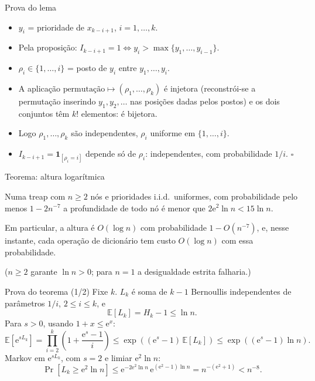 \documentclass[aspectratio=169,11pt]{beamer}
\newcommand{\E}[1]{\mathbb{E}\!\left[#1\right]}
\newcommand{\ProbE}[1]{\Pr\!\left[#1\right]}
\newcommand{\Ind}[1]{\mathbf{1}_{#1}}
\newcommand{\paren}[1]{\left(#1\right)}
\theoremstyle{definition}
\begin{document}
\begin{frame}{Prova do lema}
  \begin{itemize}
  \item $y_i$ = prioridade de $x_{k-i+1}$, $i=1,\dots,k$.
  \item Pela proposição: $I_{k-i+1}=1\iff y_i>\max\{y_1,\dots,y_{i-1}\}$.
  \pause
  \item $\rho_i\in\{1,\dots,i\}$ = posto de $y_i$ entre $y_1,\dots,y_i$.
  \item A aplicação
    $\text{permutação}\mapsto(\rho_1,\dots,\rho_k)$ é injetora
    (reconstrói-se a permutação inserindo $y_1,y_2,\dots$ nas posições
    dadas pelos postos) e os dois conjuntos têm $k!$ elementos:
    é bijetora.
  \pause
  \item Logo $\rho_1,\dots,\rho_k$ são independentes, $\rho_i$ uniforme
    em $\{1,\dots,i\}$.
  \item $I_{k-i+1}=\Ind{[\rho_i=i]}$ depende só de $\rho_i$:
    independentes, com probabilidade $1/i$. \hfill $\square$
  \end{itemize}
\end{frame}

\begin{frame}{Teorema: altura logarítmica}
  \begin{theorem}
    Numa treap com $n\ge2$ nós e prioridades i.i.d.\ uniformes, com
    probabilidade pelo menos $1-2n^{-7}$ a profundidade de todo nó é
    menor que $2\mathrm e^2\ln n<15\ln n$.
  \end{theorem}
  \pause
  Em particular, a altura é $O(\log n)$ com probabilidade
  $1-O(n^{-7})$, e, nesse instante, cada operação de dicionário tem
  custo $O(\log n)$ com essa probabilidade.

  \medskip
  \small
  ($n\ge2$ garante $\ln n>0$; para $n=1$ a desigualdade estrita
  falharia.)
\end{frame}

\begin{frame}{Prova do teorema (1/2)}
  Fixe $k$. $L_k$ é soma de $k-1$ Bernoullis independentes de
  parâmetros $1/i$, $2\le i\le k$, e
  \[
    \E{L_k}=H_k-1\le\ln n .
  \]
  \pause
  Para $s>0$, usando $1+x\le\mathrm e^x$:
  \[
    \E{\mathrm e^{sL_k}}
    =\prod_{i=2}^{k}\paren{1+\frac{\mathrm e^s-1}{i}}
    \le\exp\paren{(\mathrm e^s-1)\,\E{L_k}}
    \le\exp\paren{(\mathrm e^s-1)\ln n}.
  \]
  \pause
  Markov em $\mathrm e^{sL_k}$, com $s=2$ e limiar $\mathrm e^2\ln n$:
  \[
    \ProbE{L_k\ge\mathrm e^2\ln n}
    \le\mathrm e^{-2\mathrm e^2\ln n}\,\mathrm e^{(\mathrm e^2-1)\ln n}
    =n^{-(\mathrm e^2+1)}<n^{-8}.
  \]
\end{frame}
\end{document}
